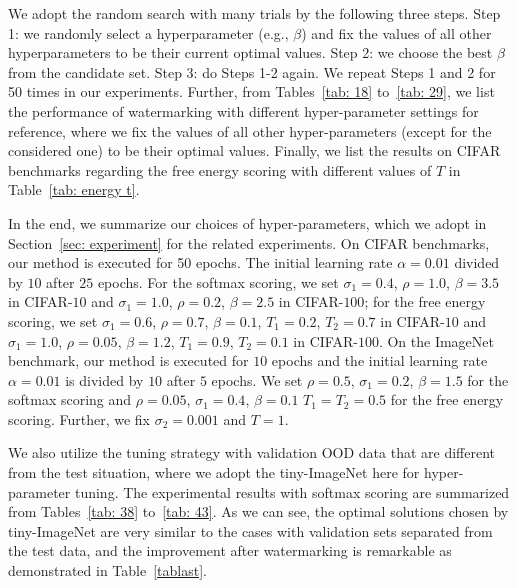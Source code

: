 \documentclass{article}
\begin{document}
{We adopt the random search with many trials by the following three steps. Step 1: we randomly select a hyperparameter (e.g., $\beta$) and fix the values of all other hyperparameters to be their current optimal values. Step 2: we choose the best $\beta$ from the candidate set. Step 3: do Steps 1-2 again. We repeat Steps 1 and 2 for 50 times in our experiments. Further, from Tables~\ref{tab: 18} to~\ref{tab: 29}, we list the performance of watermarking with different hyper-parameter settings for reference, where we fix the values of all other hyper-parameters (except for the considered one) to be their optimal values}. {Finally, we list the results on CIFAR benchmarks regarding the free energy scoring with different values of $T$ in Table~\ref{tab: energy t}.}

In the end, we summarize our choices of hyper-parameters, which we adopt in Section~\ref{sec: experiment} for the related experiments. On CIFAR benchmarks, our method is executed for 50 epochs. The initial learning rate $\alpha=0.01$ divided by $10$ after $25$ epochs. For the softmax scoring, we set $\sigma_1=0.4$, $\rho=1.0$, $\beta=3.5$ in CIFAR-$10$ and $\sigma_1=1.0$, $\rho=0.2$, $\beta=2.5$ in CIFAR-$100$; for the free energy scoring, we set $\sigma_1=0.6$, $\rho=0.7$, $\beta=0.1$, $T_1=0.2$, $T_2=0.7$ in CIFAR-$10$ and $\sigma_1=1.0$, $\rho=0.05$, $\beta=1.2$, $T_1=0.9$, $T_2=0.1$ in CIFAR-$100$. On the ImageNet benchmark, our method is executed for $10$ epochs and the initial learning rate $\alpha=0.01$ is divided by $10$ after $5$ epochs. We set $\rho=0.5$, $\sigma_1=0.2$, $\beta=1.5$ for the softmax scoring and $\rho=0.05$, $\sigma_1=0.4$, $\beta=0.1$  $T_1=T_2=0.5$ for the free energy scoring. Further, we fix $\sigma_2=0.001$ and $T=1$. 

We also utilize the tuning strategy with validation OOD data that are different from the test situation, where we adopt the tiny-ImageNet here for hyper-parameter tuning. The experimental results with softmax scoring are summarized from Tables~\ref{tab: 38} to~\ref{tab: 43}. As we can see, the optimal solutions chosen by tiny-ImageNet are very similar to the cases with validation sets separated from the test data, and the improvement after watermarking is remarkable as demonstrated in Table~\ref{tablast}. 

\vspace{-5pt}
\end{document}
